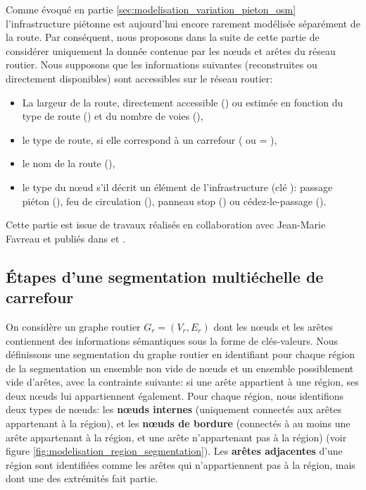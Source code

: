 \newpage
Comme évoqué en partie \ref{sec:modelisation_variation_pieton_osm} l'infrastructure piétonne est aujourd'hui encore rarement modélisée séparément de la route. Par conséquent, nous proposons dans la suite de cette partie de considérer uniquement la donnée contenue par les nœuds et arêtes du réseau routier. Nous supposons que les informations suivantes (reconstruites ou directement disponibles) sont accessibles sur le réseau routier:
\begin{itemize}
    \item La largeur de la route, directement accessible () ou estimée en fonction du type de route () et du nombre de voies (),
    \item le type de route, si elle correspond à un carrefour ( ou  = ),
    \item le nom de la route (),
    \item le type du nœud s'il décrit un élément de l'infrastructure (clé ): passage piéton (), feu de circulation (), panneau stop () ou cédez-le-passage ().
\end{itemize}

\newpar{}

Cette partie est issue de travaux réalisés en collaboration avec Jean-Marie Favreau et publiés dans \citep{Favreau2022} et \citep{Kalsron2022}.

\subsection{Étapes d'une segmentation multiéchelle de carrefour}

On considère un graphe routier $G_r = (V_r,E_r)$ dont les nœuds et les arêtes contiennent des informations sémantiques sous la forme de clés-valeurs. Nous définissons une segmentation du graphe routier en identifiant pour chaque région de la segmentation un ensemble non vide de nœuds et un ensemble possiblement vide d'arêtes, avec la contrainte suivante: si une arête appartient à une région, ses deux nœuds lui appartiennent également.
Pour chaque région, nous identifions deux types de nœuds: les \textbf{nœuds internes} (uniquement connectés aux arêtes appartenant à la région), et les \textbf{nœuds de bordure} (connectés à au moins une arête appartenant à la région, et une arête n'appartenant pas à la région) (voir figure \ref{fig:modelisation_region_segmentation}).
Les \textbf{arêtes adjacentes} d'une région sont identifiées comme les arêtes qui n'appartiennent pas à la région, mais dont une des extrémités fait partie.

